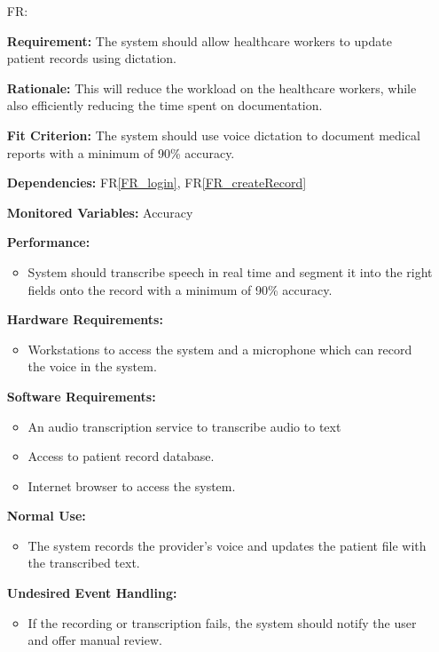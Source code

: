 \documentclass[12pt]{article}
\newcounter{reqnum} %
\begin{document}
\begin{itemize}
  \item[FR\refstepcounter{reqnum}\thereqnum \label{FR_DictationRecording}:]
  
  \textbf{Requirement:} The system should allow healthcare workers to update patient records using dictation. 
      
  \textbf{Rationale:} This will reduce the workload on the healthcare workers, while also efficiently reducing the time spent on documentation. 
      
  \textbf{Fit Criterion:} The system should use voice dictation to document medical reports with a minimum of 90\% accuracy. 
      
  \textbf{Dependencies:} FR\ref{FR_login}, FR\ref{FR_createRecord} 
      
  \textbf{Monitored Variables:} Accuracy
      
  \textbf{Performance:} 
    \begin{itemize}
        \item System should transcribe speech in real time and segment it into the right fields onto the record with a minimum of 90\% accuracy.
    \end{itemize}
      
  \textbf{Hardware Requirements:}
    \begin{itemize}
        \item Workstations to access the system and a microphone which can record the voice in the system. 
    \end{itemize}
      
  \textbf{Software Requirements:}
    \begin{itemize}
        \item An audio transcription service to transcribe audio to text 
        \item Access to patient record database. 
        \item Internet browser to access the system.  
    \end{itemize}
      
  \textbf{Normal Use:} 
  \begin{itemize}
    \item The system records the provider's voice and updates the patient file with the transcribed text.
  \end{itemize}
      
  \textbf{Undesired Event Handling:} 
  \begin{itemize}
    \item If the recording or transcription fails, the system should notify the user and offer manual review.
  \end{itemize}
  

\end{itemize}
\end{document}
